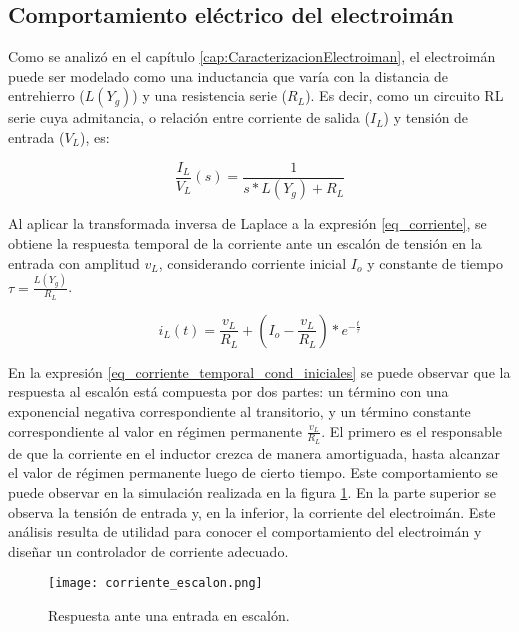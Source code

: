 \subsection{Comportamiento eléctrico del electroimán}\label{sec_comportamiento-electrico-electroiman}

Como se analizó en el capítulo \ref{cap:CaracterizacionElectroiman}, el electroimán puede ser modelado como una inductancia que varía con la distancia de entrehierro ($L(Y_g)$) y una resistencia serie ($R_L$). Es decir, como un circuito RL serie cuya admitancia, o relación entre corriente de salida ($I_L$) y tensión de entrada ($V_L$), es:

\begin{equation} \label{eq_corriente}
	\frac{I_L}{V_L}(s)=\frac{1}{s*L(Y_g)+R_L}
\end{equation}

Al aplicar la transformada inversa de Laplace a la expresión  \ref{eq_corriente}, se obtiene la respuesta temporal de la corriente ante un escalón de tensión en la entrada con amplitud $v_L$, considerando corriente inicial $I_o$ y constante de tiempo $\tau=\frac{L(Y_g)}{R_L}$.

\begin{equation} \label{eq_corriente_temporal_cond_iniciales}
	i_L(t)=\frac{v_L}{R_L} + (I_o-\frac{v_L}{R_L})*e^{-\frac{t}{\tau}}
\end{equation}

En la expresión \ref{eq_corriente_temporal_cond_iniciales} se puede observar que la respuesta al escalón está compuesta por dos partes: un término con una exponencial negativa correspondiente al transitorio, y un término constante correspondiente al valor en régimen permanente $\frac{v_L}{R_L}$. El primero es el responsable de que la corriente en el inductor crezca de manera amortiguada, hasta alcanzar el valor de régimen permanente luego de cierto tiempo. Este comportamiento se puede observar en la simulación realizada en la figura \ref{fig:img_respuesta_escalon}. En la parte superior se observa la tensión de entrada y, en la inferior, la corriente del electroimán. Este análisis resulta de utilidad para conocer el comportamiento del electroimán y diseñar un controlador de corriente adecuado.


\begin{figure}[H]
	\centering
	\texttt{[image: corriente\_escalon.png]}
	\caption{Respuesta ante una entrada en escalón.}
	\label{fig:img_respuesta_escalon}
\end{figure}

